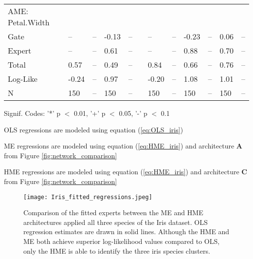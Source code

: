 \documentclass[12pt]{article}
\theoremstyle{definition}
\begin{document}
\begin{landscape}
\begin{table}
\begin{threeparttable}
\begin{tabular}[l]{l l l l l l l l l l l l}
  AME: Petal.Width \\
  \cmidrule(r){1-1}
  Gate               & --   & --     & -0.13 & --        && --    & --     & -0.23 & --     & 0.06  & --           \\
  Expert             & --   & --     &  0.61 & --        && --    & --     &  0.88 & --     & 0.70  & --           \\
  Total              & 0.57 & --     &  0.49 & --        && 0.84  & --     &  0.66 & --     & 0.76  & --           \\[0.3cm]


  Log-Like           & -0.24 & --    & 0.97  & --      && -0.20  & --    & 1.08 & --     & 1.01  & --            \\
  N                  & 150   & --    & 150   & --      && 150    & --    & 150  & --     & 150   & --            \\

	\hline
		\end{tabular}
		\begin{tablenotes}
			\item{\footnotesize Signif. Codes: '*' p $<$ 0.01, '+' p $<$ 0.05, '-' p $<$ 0.1}
			\item{\footnotesize OLS regressions are modeled using equation (\ref{eq:OLS_iris})}
			\item{\footnotesize ME regressions are modeled using equation (\ref{eq:HME_iris}) and architecture $\boldsymbol{A}$ from Figure \ref{fig:network_comparison}}
			\item{\footnotesize HME regressions are modeled using equation (\ref{eq:HME_iris}) and architecture $\boldsymbol{C}$ from Figure \ref{fig:network_comparison}}
		\end{tablenotes} \label{tbl:Iris}
	\end{threeparttable}
\end{table}
\end{landscape}


\begin{figure}[!ht]
  \texttt{[image: Iris\_fitted\_regressions.jpeg]}
  \caption{Comparison of the fitted experts between the ME and HME architectures
  applied all three species of the Iris dataset. OLS regression estimates are
  drawn in solid lines. Although the HME and ME both achieve superior
  log-likelihood values compared to OLS, only the HME is able to identify the
  three iris species clusters.}
  \label{fig:Iris_fitted_regressions}
\end{figure}
\end{document}
